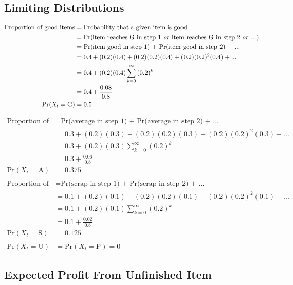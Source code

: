 \documentclass[12pt]{article}
\begin{document}
\subsection{Limiting Distributions}
	
\begin{align*}
	\text{Proportion of good items} & = \text{Probability that a given item is good} \\
	& = \text{Pr(item reaches G in step 1 \textit{or} item reaches G in step 2 \textit{or} ...)} \\
	& = \text{Pr(item good in step 1) + Pr(item good in step 2) + ...}\\
	& = 0.4 + (0.2)(0.4) + (0.2)(0.2)(0.4) + (0.2)(0.2)^2(0.4) + ... \\
	& = 0.4 + (0.2)(0.4)\sum_{k=0}^{\infty}{(0.2)^k}\\
	& = 0.4 + \frac{0.08}{0.8}\\
	\text{Pr}(X_t = \text{G})& = 0.5
\end{align*}

\begin{align*}
	\text{Proportion of average items} & = \text{Pr(average in step 1) + Pr(average in step 2) + ...}\\
	& = 0.3 + (0.2)(0.3) + (0.2)(0.2)(0.3) + (0.2)(0.2)^2(0.3) + ... \\
	& = 0.3 + (0.2)(0.3)\sum_{k=0}^{\infty}{(0.2)^k}\\
	& = 0.3 + \frac{0.06}{0.8}\\
	\text{Pr}(X_t = \text{A})& = 0.375\\
&\\
	\text{Proportion of scrapped items} & = \text{Pr(scrap in step 1) + Pr(scrap in step 2) + ...}\\
	& = 0.1 + (0.2)(0.1) + (0.2)(0.2)(0.1) + (0.2)(0.2)^2(0.1) + ... \\
	& = 0.1 + (0.2)(0.1)\sum_{k=0}^{\infty}{(0.2)^k}\\
	& = 0.1 + \frac{0.02}{0.8}\\
	\text{Pr}(X_t = \text{S})& = 0.125\\
	& \\
	\text{Pr}(X_t = \text{U}) &= \text{Pr}(X_t = \text{P}) = 0
\end{align*}
\newline
\subsection{Expected Profit From Unfinished Item}
\end{document}
